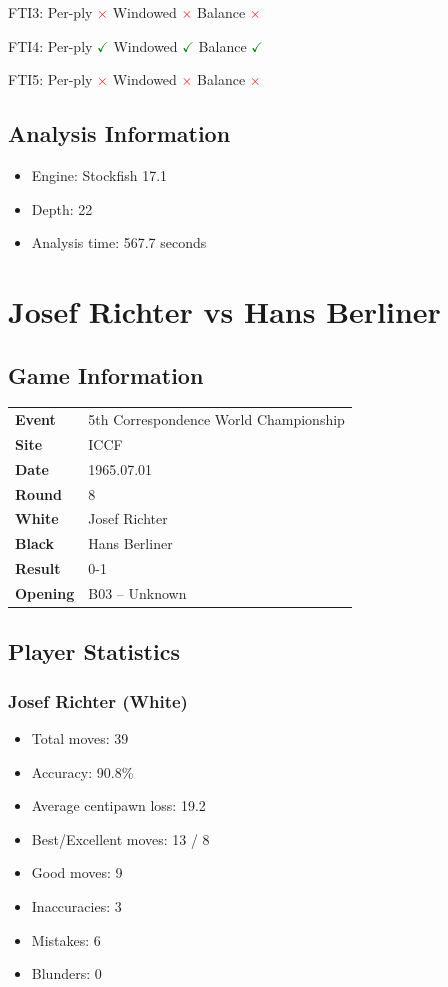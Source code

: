 \documentclass[11pt]{book}
\begin{document}
FTI3: Per-ply \textcolor{red}{$\times$} \quad Windowed \textcolor{red}{$\times$} \quad Balance \textcolor{red}{$\times$}

FTI4: Per-ply \textcolor{green}{$\checkmark$} \quad Windowed \textcolor{green}{$\checkmark$} \quad Balance \textcolor{green}{$\checkmark$}

FTI5: Per-ply \textcolor{red}{$\times$} \quad Windowed \textcolor{red}{$\times$} \quad Balance \textcolor{red}{$\times$}

\section{Analysis Information}
\begin{itemize}
\item Engine: Stockfish 17.1
\item Depth: 22
\item Analysis time: 567.7 seconds
\end{itemize}

\chapter{Josef Richter vs Hans Berliner}

\section{Game Information}
\begin{tabular}{ll}
\textbf{Event} & 5th Correspondence World Championship \\
\textbf{Site} & ICCF \\
\textbf{Date} & 1965.07.01 \\
\textbf{Round} & 8 \\
\textbf{White} & Josef Richter \\
\textbf{Black} & Hans Berliner \\
\textbf{Result} & 0-1 \\
\textbf{Opening} & B03 -- Unknown \\
\end{tabular}

\section{Player Statistics}

\subsection{Josef Richter (White)}
\begin{itemize}
\item Total moves: 39
\item Accuracy: 90.8\%
\item Average centipawn loss: 19.2
\item Best/Excellent moves: 13 / 8
\item Good moves: 9
\item Inaccuracies: 3
\item Mistakes: 6
\item Blunders: 0
\end{itemize}
\end{document}
